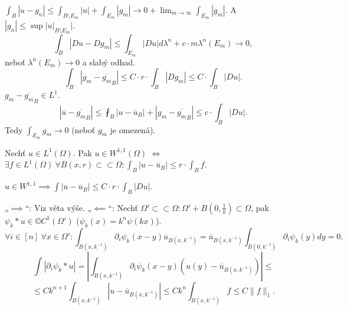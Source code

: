 \documentclass[12pt]{article}					%
\begin{document}
\begin{veta}
\begin{dukazin}
		$\int_B |u - g_n| ≤ \int_{B \setminus E_m} |u| + \int_{E_m} |g_m| \rightarrow 0 + \lim_{m \rightarrow ∞} \int_{E_m} |g_m|$. A $|g_n| ≤ \sup |u|_{B \setminus E_m}|$.
		$$ \int_B |Du - Dg_m| ≤ \int_{E_m} |Du| dλ^n + c·m λ^n(E_m) \rightarrow 0, $$
		neboť $λ^n(E_m) \rightarrow 0$ a slabý odhad.
		$$ \int_B |g_m - \overline{g_m}_B| ≤ C·r·\int_B |D g_m| ≤ C·\int_B |Du|. $$
		$g_m - \overline{g_m}_B \in L^1$.
		$$ |\overline u - \overline{g_m}_B| ≤ \fint_B |u - \overline u_B| + |g_m - \overline{g_m}_B| ≤ c·\int_B |Du|. $$
		Tedy $\int_{E_m} g_m \rightarrow 0$ (neboť $g_m$ je omezená).
	\end{dukazin}
\end{veta}

\begin{veta}
	Nechť $u \in L^1(Ω)$. Pak $u \in W^{1, 1}(Ω)$ $\Leftrightarrow$ $\exists f \in L^1(Ω)\ \forall B(x, r) \subset\subset Ω: \int_B |u - \overline u_B| ≤ r·\int_B f$.

	\begin{dukazin}
		$u \in W^{1, 1} \implies \int |u - \overline u_B| ≤ C·r·\int_B |Du|$.

		„$\implies$“: Viz věta výše. „$\impliedby$“: Nechť $Ω' \subset \subset Ω: Ω' + B(0, \frac{1}{k}) \subset Ω$, pak $ψ_k * u \in ©C^1(Ω')$ ($ψ_k(x) = k^n ψ(kx)$).
		$$ \forall i \in [n]\ \forall x \in Ω': \int_{B(x, k^{-1})} \partial_i ψ_k(x - y) \overline u_{B(x, k^{-1})} = \overline u_{B(x, k^{-1})} \int_{B(0, k^{-1})} \partial_i ψ_k(y) dy = 0. $$
		$$ \int |\partial_i ψ_k * u| = \left| \int_{B(x, k^{-1})} \partial_i ψ_k(x - y)(u(y) - \overline u_{B(x, k^{-1})}) \right| ≤ $$
		$$ ≤ C k^{n+1} \int_{B(x, k^{-1})} |u - \overline u_{B(x, k^{-1})}| ≤ C k^n \int_{B(x, k^{-1})} f ≤ C \|f\|_1. $$
	\end{dukazin}
\end{veta}
\end{document}
